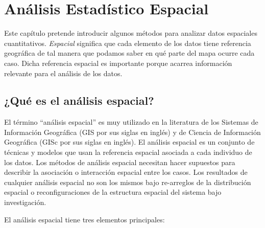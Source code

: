 
\chapter{Análisis Estadístico Espacial}
Este capítulo pretende introducir algunos métodos para analizar datos espaciales cuantitativos. \textit{Espacial} significa que cada elemento de los datos tiene referencia geográfica de tal manera que podamos saber en qué parte del mapa ocurre cada caso. Dicha referencia espacial es importante porque acarrea información relevante para el análisis de los datos.

\section{¿Qué es el análisis espacial?}
El término ``análisis espacial'' es muy utilizado en la literatura de  los Sistemas de Información Geográfica (GIS por sus siglas en inglés)  y de Ciencia de Información Geográfica (GISc por sus siglas en inglés). El análisis espacial es un conjunto de técnicas y modelos que usan la referencia espacial asociada a cada individuo de los datos. Los métodos de análisis espacial necesitan hacer supuestos para describir la asociación o interacción espacial entre los casos. Los resultados de cualquier análisis espacial no son los mismos bajo re-arreglos de la distribución espacial o reconfiguraciones de la estructura espacial del sistema bajo investigación.

El análisis espacial tiene tres elementos principales:

